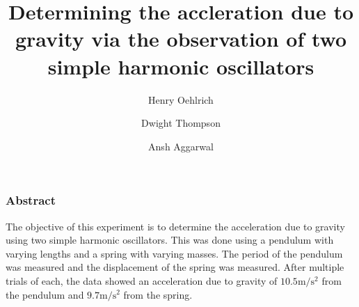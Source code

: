 \documentclass[10pt]{beamer}
\title{Determining the accleration due to gravity via the observation of two simple harmonic oscillators}
\author{Henry Oehlrich \and Dwight Thompson \and Ansh Aggarwal}
\begin{document}
\maketitle

\begin{frame}
    \frametitle{Abstract}
    The objective of this experiment is to determine the acceleration due to
    gravity using two simple harmonic oscillators. This was done using a
    pendulum with varying lengths and a spring with varying masses. The period
    of the pendulum was measured and the displacement of the spring was
    measured. After multiple trials of each, the data showed an acceleration due
    to gravity of $10.5\si{\meter\per\second\squared}$ from the pendulum and
    $9.7\si{\meter\per\second\squared}$ from the spring.
\end{frame}
\end{document}
